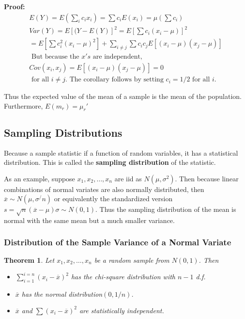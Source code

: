 \documentclass{article}
\newtheorem{theorem}{Theorem}[section]
\begin{document}
\textbf{Proof:} \begin{equation*}
    \begin{split}
        E(Y)=E(\sum_i c_ix_i)=\sum c_i E(x_i)=\mu(\sum c_i)\\
        Var(Y)=E[(Y-E(Y)]^2=E[\sum c_i(x_i-\mu)]^2\\
        = E\left[\sum c_i^2(x_i-\mu)^2\right]+\sum_{i \neq j} \sum c_i c_j E[(x_i-\mu)(x_j-\mu)]\\
        \text{ But because the } x's \text{ are independent,}\\
        Cov(x_i,x_j)=E[(x_i-\mu)(x_j-\mu)]=0\\
        \text{ for all } i \neq j. \text{ The corollary follows by setting } c_i=1/2 \text{ for all } i. 
    \end{split}
\end{equation*}

Thus the expected value of the mean of a sample is the mean of the population. Furthermore, \(E(m_r)=\mu_r'\)

\subsection{Sampling Distributions}

Because a sample statistic if a function of random variables, it has a statistical distribution. This is called the \textbf{sampling distribution} of the statistic.

As an example, suppose \(x_1,x_2,\dots,x_n\) are iid as \(N(\mu,\sigma^2)\). Then because linear combinations of normal variates are also normally distributed, then \(\overline{x}\sim N(\mu,\sigma^/n)\) or equivalently the standardized version \(s=\sqrt{n} (\overline{x}-\mu)\sigma\sim N(0,1)\). Thus the sampling distribution of the mean is normal with the same mean but a much smaller variance.

\subsubsection{Distribution of the Sample Variance of a Normal Variate}

\begin{theorem}
    Let \(x_1,x_2,\dots,x_n\) be a random sample from \(N(0,1)\). Then
    \begin{itemize}
        \item[a)] \(\sum_{i=1}^{i=n}(x_i-\overline{x})^2\) has the chi-square distribution with \(n-1\) d.f.
        \item[b)] \(\overline{x}\) has the normal distribution\((0,1/n)\).
        \item[c)] \(\overline{x}\) and \(\sum(x_i-\overline{x})^2\) are statistically independent.
    \end{itemize}
\end{theorem}
\end{document}
